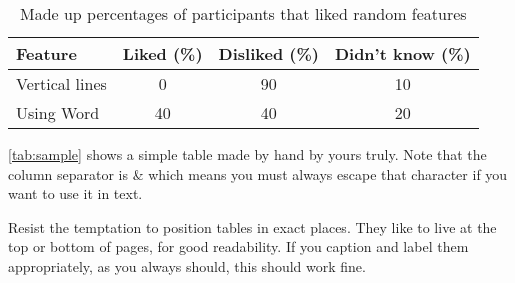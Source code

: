 \begin{table}
    \centering
    \caption{Made up percentages of participants that liked random features}
    \label{tab:sample}
    \begin{tabular}{lccc}
        \toprule
        \textbf{Feature} & \textbf{Liked (\%)} & \textbf{Disliked (\%)} & \textbf{Didn't know (\%)}  \\ \midrule
        Vertical lines & 0 & 90 & 10 \\
        Using Word & 40 & 40 & 20 \\
        \bottomrule
    \end{tabular}
    
\end{table}

\noindent \autoref{tab:sample} shows a simple table made by hand by yours truly. Note that the column separator is \& which means you must always escape that character if you want to use it in text.

Resist the temptation to position tables in exact places. They like to live at the top or bottom of pages, for good readability. If you caption and label them appropriately, as you always should, this should work fine. 



